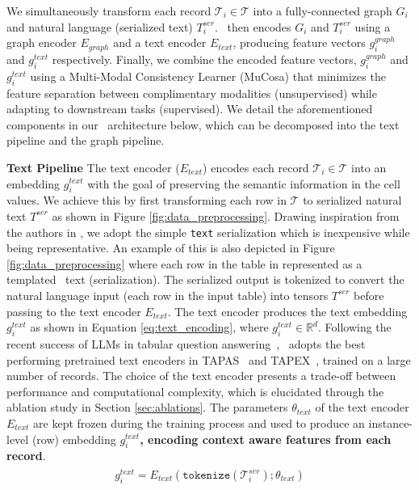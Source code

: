 We simultaneously transform each record $\mathcal{T}_i \in \mathcal{T}$ into a fully-connected graph $G_i$ and natural language (serialized text) $T_i^{ser}$. 
\tabglm\ then encodes $G_i$ and $T_i^{ser}$ using a graph encoder $E_{graph}$ and a text encoder $E_{text}$, producing feature vectors $g_i^{graph}$ and $g_i^{text}$ respectively.
Finally, we combine the encoded feature vectors, $g_i^{graph}$ and $g_i^{text}$ using a Multi-Modal Consistency Learner (MuCosa) that minimizes the feature separation between complimentary modalities (unsupervised) while adapting to downstream tasks (supervised).
We detail the aforementioned components in our \tabglm\ architecture below, which can be decomposed into the text pipeline and the graph pipeline.



\noindent \textbf{Text Pipeline } The text encoder ($E_{text}$) encodes each record $\mathcal{T}_i \in\mathcal{T}$ into an embedding $g_i^{text}$ with the goal of preserving the semantic information in the cell values. 
We achieve this by first transforming each row in $\mathcal{T}$ to serialized natural text $T^{ser}$ as shown in Figure \ref{fig:data_preprocessing}. 
Drawing inspiration from the authors in \citet{tabllm}, we adopt the simple \texttt{text} serialization which is inexpensive while being representative. An example of this is also depicted in Figure \ref{fig:data_preprocessing} where each row in the table in represented as a templated~\cite{tabllm, tapas} text (serialization). 
The serialized output is tokenized to convert the natural language input (each row in the input table) into tensors $T^{ser}$ before passing to the text encoder $E_{text}$. The text encoder produces the text embedding $g_i^{text}$ as shown in Equation \ref{eq:text_encoding}, where $g_i^{text} \in \mathbb{R}^d$.
Following the recent success of LLMs in tabular question answering~\cite{tapex, tapas}, \tabglm\ adopts the best performing pretrained text encoders in TAPAS~\cite{tapas} and TAPEX~\cite{tapex}, trained on a large number of records. 
The choice of the text encoder presents a trade-off between performance and computational complexity, which is elucidated through the ablation study in Section \ref{sec:ablations}.
The parameters $\theta_{text}$ of the text encoder $E_{text}$ are kept frozen during the training process and used to produce an instance-level (row) embedding \textbf{$g_i^{text}$, encoding context aware features from each record}.
\begin{align}
\begin{split}
g_i^{text} = E_{text}(\texttt{tokenize}(\mathcal{T}_i^{ser}); \theta_{text})
\end{split}
\label{eq:text_encoding}
\end{align}

